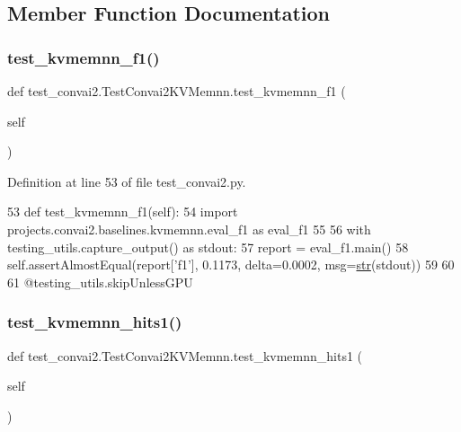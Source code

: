 \subsection{Member Function Documentation}
\mbox{\label{classtest__convai2_1_1TestConvai2KVMemnn_a85c9f140bc57a1f1e8b011a2034e74fc}} 
\subsubsection{\texorpdfstring{test\+\_\+kvmemnn\+\_\+f1()}{test\_kvmemnn\_f1()}}
{\footnotesize\ttfamily def test\+\_\+convai2.\+Test\+Convai2\+K\+V\+Memnn.\+test\+\_\+kvmemnn\+\_\+f1 (\begin{DoxyParamCaption}\item[{}]{self }\end{DoxyParamCaption})}



Definition at line 53 of file test\+\_\+convai2.\+py.


\begin{DoxyCode}
53     \textcolor{keyword}{def }test\_kvmemnn\_f1(self):
54         \textcolor{keyword}{import} projects.convai2.baselines.kvmemnn.eval\_f1 \textcolor{keyword}{as} eval\_f1
55 
56         with testing\_utils.capture\_output() \textcolor{keyword}{as} stdout:
57             report = eval\_f1.main()
58         self.assertAlmostEqual(report[\textcolor{stringliteral}{'f1'}], 0.1173, delta=0.0002, msg=\hyperlink{namespacegenerate__task__READMEs_a5b88452ffb87b78c8c85ececebafc09f}{str}(stdout))
59 
60 
61 @testing\_utils.skipUnlessGPU
\end{DoxyCode}
\mbox{\label{classtest__convai2_1_1TestConvai2KVMemnn_a8d4b821e481c61a125658e0ac5045762}} 
\subsubsection{\texorpdfstring{test\+\_\+kvmemnn\+\_\+hits1()}{test\_kvmemnn\_hits1()}}
{\footnotesize\ttfamily def test\+\_\+convai2.\+Test\+Convai2\+K\+V\+Memnn.\+test\+\_\+kvmemnn\+\_\+hits1 (\begin{DoxyParamCaption}\item[{}]{self }\end{DoxyParamCaption})}



